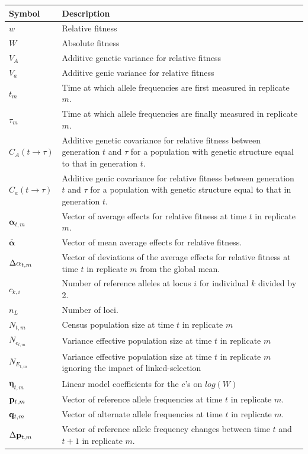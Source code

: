 \documentclass[12pt]{article}
\begin{document}
\begin{longtable}{|p{2cm}|p{13cm}|}
\hline
Symbol&Description\\
\hline
$w$&Relative fitness\\
$W$&Absolute fitness\\
$V_A$&Additive genetic variance for relative fitness\\
$V_a$&Additive genic variance for relative fitness\\
$t_m$&Time at which allele frequencies are first measured in replicate $m$.\\
$\tau_m$&Time at which allele frequencies are finally measured in replicate $m$.\\
$C_{A}(t\rightarrow\tau)$&Additive genetic covariance for relative fitness between generation $t$ and $\tau$ for a population with genetic structure equal to that in generation $t$.\\
$C_{a}(t\rightarrow\tau)$&Additive genic covariance for relative fitness between generation $t$ and $\tau$ for a population with genetic structure equal to that in generation $t$.\\
$\boldsymbol{\alpha}_{t,m}$& Vector of average effects for relative fitness at time $t$ in replicate $m$.\\
$\bar{\boldsymbol{\alpha}}$& Vector of mean average effects for relative fitness.\\
$\Delta{\bf \alpha}_{t,m}$&Vector of deviations of the average effects for relative fitness at time $t$ in replicate $m$ from the global mean.\\
$c_{k,i}$& Number of reference alleles at locus $i$ for individual $k$ divided by 2.\\
$n_L$&Number of loci.\\
$N_{t,m}$&Census population size at time $t$ in replicate $m$\\
$N_{e_{t,m}}$&Variance effective population size at time $t$ in replicate $m$\\
$N_{E_{t,m}}$&Variance effective population size at time $t$ in replicate $m$ ignoring the impact of linked-selection\\
$\boldsymbol{\eta}_{t,m}$&Linear model coefficients for the $c$'s on $log(W)$\\
${\bf p}_{t,m}$& Vector of reference allele frequencies at time $t$ in replicate $m$.\\
${\bf q}_{t,m}$& Vector of alternate allele frequencies at time $t$ in replicate $m$.\\
$\Delta {\bf p}_{t,m}$&Vector of reference allele frequency changes between time $t$ and $t+1$ in replicate $m$.\\

\end{longtable}
\end{document}

